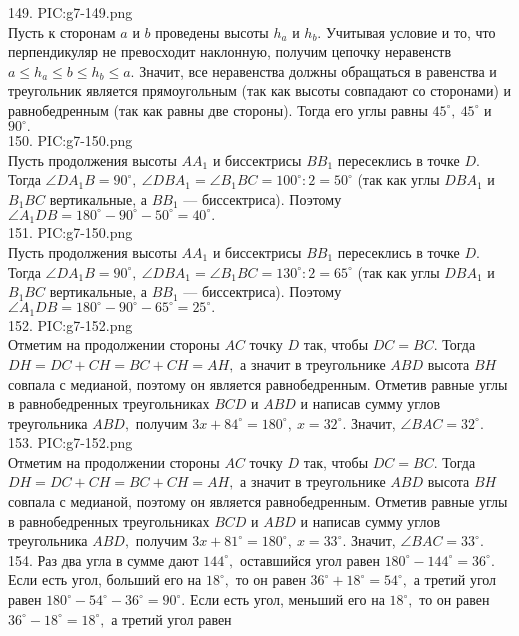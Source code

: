149. {{PIC:g7-149.png}}\\
Пусть к сторонам $a$ и $b$ проведены высоты $h_a$ и $h_b.$ Учитывая условие и то, что перпендикуляр не превосходит наклонную, получим цепочку неравенств $a\leqslant h_a\leqslant b \leqslant h_b \leqslant a.$ Значит, все неравенства должны обращаться в равенства и треугольник является прямоугольным (так как высоты совпадают со сторонами) и равнобедренным (так как равны две стороны). Тогда его углы равны $45^\circ,\ 45^\circ$ и $90^\circ.$\\
150. {{PIC:g7-150.png}}\\
Пусть продолжения высоты $AA_1$ и биссектрисы $BB_1$ пересеклись в точке $D.$ Тогда $\angle DA_1B=90^\circ,\ \angle DBA_1=\angle B_1BC=100^\circ:2=50^\circ$ (так как углы $DBA_1$ и $B_1BC$ вертикальные, а $BB_1$ --- биссектриса). Поэтому $\angle A_1DB=180^\circ-90^\circ-50^\circ=40^\circ.$\\
151.  {{PIC:g7-150.png}}\\
Пусть продолжения высоты $AA_1$ и биссектрисы $BB_1$ пересеклись в точке $D.$ Тогда $\angle DA_1B=90^\circ,\ \angle DBA_1=\angle B_1BC=130^\circ:2=65^\circ$ (так как углы $DBA_1$ и $B_1BC$ вертикальные, а $BB_1$ --- биссектриса). Поэтому $\angle A_1DB=180^\circ-90^\circ-65^\circ=25^\circ.$\\
152. {{PIC:g7-152.png}}\\
Отметим на продолжении стороны $AC$ точку $D$ так, чтобы $DC=BC.$ Тогда $DH=DC+CH=BC+CH=AH,$ а значит в треугольнике $ABD$ высота $BH$ совпала с медианой, поэтому он является равнобедренным. Отметив равные углы в равнобедренных треугольниках $BCD$ и $ABD$ и написав сумму углов треугольника $ABD,$ получим $3x+84^\circ=180^\circ,\ x=32^\circ.$ Значит, $\angle BAC=32^\circ.$\\
153. {{PIC:g7-152.png}}\\
Отметим на продолжении стороны $AC$ точку $D$ так, чтобы $DC=BC.$ Тогда $DH=DC+CH=BC+CH=AH,$ а значит в треугольнике $ABD$ высота $BH$ совпала с медианой, поэтому он является равнобедренным. Отметив равные углы в равнобедренных треугольниках $BCD$ и $ABD$ и написав сумму углов треугольника $ABD,$ получим $3x+81^\circ=180^\circ,\ x=33^\circ.$ Значит, $\angle BAC=33^\circ.$\\
154. Раз два угла в сумме дают $144^\circ,$ оставшийся угол равен $180^\circ-144^\circ=36^\circ.$ Если есть угол, больший его на $18^\circ,$ то он равен $36^\circ+18^\circ=54^\circ,$ а третий угол равен $180^\circ-54^\circ-36^\circ=90^\circ.$ Если есть угол, меньший его на $18^\circ,$ то он равен $36^\circ-18^\circ=18^\circ,$ а третий угол равен
